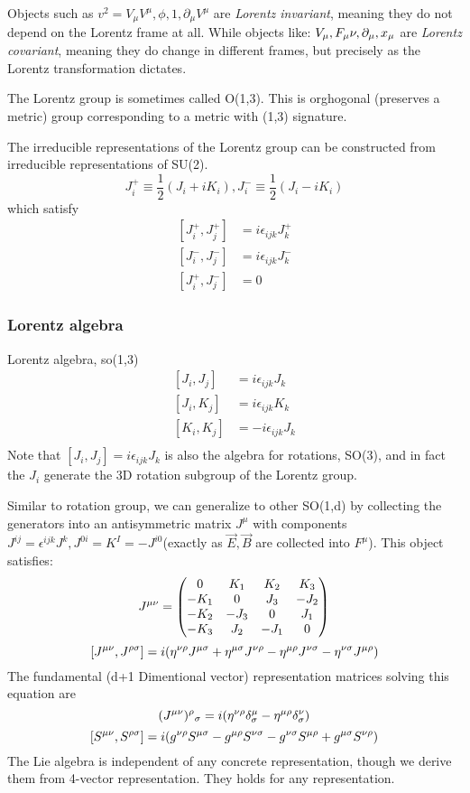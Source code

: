 Objects such as $v^2 = V_\mu V^\mu, \phi, 1, \partial_\mu V^\mu$ are
\emph{Lorentz invariant}, meaning they do not depend on the Lorentz frame at
all. While objects like: $V_\mu, F_\mu\nu, \partial_\mu, x_\mu$ are
\emph{Lorentz covariant}, meaning they do change in different frames, but
precisely as the Lorentz transformation dictates.

The Lorentz group is sometimes called O(1,3). This is orghogonal (preserves
a metric) group corresponding to a metric with (1,3) signature.

The irreducible representations of the Lorentz group can be constructed from
irreducible representations of SU(2). 
\[
    J^+_i \equiv \frac{1}{2}(J_i + iK_i), 
    J^-_i \equiv \frac{1}{2}(J_i - iK_i)
\]
which satisfy
\[
    \begin{aligned}
	[J^+_i, J^+_j] &= i\epsilon_{ijk}J^+_k    \\
	[J^-_i, J^-_j] &= i\epsilon_{ijk}J^-_k    \\
	[J^+_i, J^-_j] &= 0 
    \end{aligned}
\]

\subsubsection{Lorentz algebra}
Lorentz algebra, so(1,3)
\[
    \begin{aligned}
	[J_i, J_j] &= i\epsilon_{ijk}J_k    \\
	[J_i, K_j] &= i\epsilon_{ijk}K_k    \\
	[K_i, K_j] &= -i\epsilon_{ijk}J_k    \\
    \end{aligned}
\]
Note that $ [J_i, J_j] = i\epsilon_{ijk}J_k $ is also the algebra for
rotations, SO(3), and in fact the $J_i$ generate the 3D rotation subgroup of
the Lorentz group.

Similar to rotation group, we can generalize to other SO(1,d) by collecting
the generators into an antisymmetric matrix $J^{\mu}$ with components
$J^{ij} = \epsilon^{ijk}J^k, J^{0i} = K^I = -J^{i0}$(exactly as $\vec{E},
\vec{B}$ are collected into $F^{\mu}$). This object satisfies:
\[
    J^{\mu\nu}=
    \begin{pmatrix}
	0   & K_1   & K_2   & K_3   \\
	-K_1	& 0 & J_3   & -J_2  \\
	-K_2	& -J_3	& 0 & J_1   \\
	-K_3	& J_2	& -J_1	& 0 \\
    \end{pmatrix}
    \]
\[
    [J^{\mu\nu}, J^{\rho\sigma}]=
    i( \eta^{\nu\rho}J^{\mu\sigma}
    +\eta^{\mu\sigma}J^{\nu\rho} 
    -\eta^{\mu\rho}J^{\nu\sigma}
    -\eta^{\nu\sigma}J^{\mu\rho}
    )
    \]
The fundamental (d+1 Dimentional vector) representation matrices solving
this equation are 
\[
    (J^{\mu\nu})^\rho{}_\sigma = i(\eta^{\nu\rho}\delta^{\mu}_\sigma -
    \eta^{\mu\rho}\delta^{\nu}_{\sigma})
    \]
\[
    [S^{\mu\nu}, S^{\rho\sigma}]=
    i( g^{\nu\rho}S^{\mu\sigma}
    -g^{\mu\rho}S^{\nu\sigma}
    -g^{\nu\sigma}S^{\mu\rho}
    +g^{\mu\sigma}S^{\nu\rho} )
    \]
The Lie algebra is independent of any concrete representation, though we
derive them from 4-vector representation. They holds for any representation.

